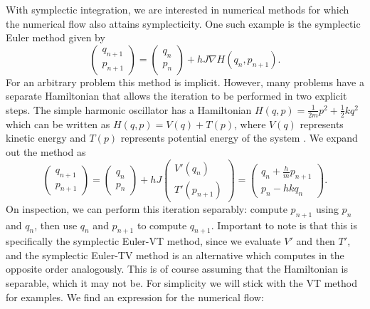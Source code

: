 With symplectic integration, we are interested in numerical methods for which the numerical flow also attains symplecticity.
One such example is the symplectic Euler method \cite{gni2006} given by
\begin{equation*}
	\begin{pmatrix}
		q_{n+1} \\
		p_{n+1} 
	\end{pmatrix} = \begin{pmatrix}
		q_{n} \\
		p_{n}
	\end{pmatrix} + h J \nabla H(q_{n}, p_{n+1}).
\end{equation*}
For an arbitrary problem this method is implicit. However, many problems have a separate Hamiltonian that allows the iteration to be performed in two explicit steps. 
The simple harmonic oscillator has a Hamiltonian $H(q, p) = \frac{1}{2m}p^2 + \frac{1}{2}kq^2$ which can be written as $H(q, p) = V(q) + T(p)$, where $V(q)$ represents kinetic energy and $T(p)$ represents potential energy of the system \cite{gni2006, Casas_2016}.
We expand out the method as
\begin{equation*}
	\begin{pmatrix}
		q_{n+1} \\
		p_{n+1} 
	\end{pmatrix} = \begin{pmatrix}
		q_{n} \\
		p_{n}
	\end{pmatrix} + h {J} \begin{pmatrix}
		V'(q_n) \\
		T'(p_{n+1})
	\end{pmatrix} = \begin{pmatrix}
		q_{n} + \frac{h}{m}p_{n+1} \\
		p_{n} - hk q_n
	\end{pmatrix}.
\end{equation*}
On inspection, we can perform this iteration separably: compute $p_{n+1}$ using $p_n$ and $q_n$,
then use $q_n$ and $p_{n+1}$ to compute $q_{n+1}$.
Important to note is that this is specifically the symplectic Euler-VT method, since we evaluate $V'$ and then $T'$,
and the symplectic Euler-TV method is an alternative which computes in the opposite order analogously.
This is of course assuming that the Hamiltonian is separable, which it may not be.
For simplicity we will stick with the VT method for examples.
We find an expression for the numerical flow:
